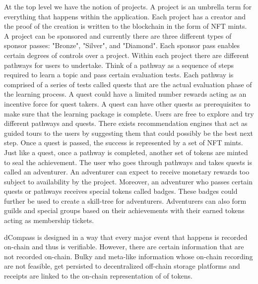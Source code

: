 \documentclass[12pt, a4paper]{article}
\begin{document}
At the top level we have the notion of projects. A project is an umbrella term for everything that happens within the application. Each project has a creator and the proof of the creation is written to the blockchain in the form of NFT mints. A project can be sponsored and currently there are three different types of sponsor passes: "Bronze", "Silver", and "Diamond". Each sponsor pass enables certain degrees of controls over a project. Within each project there are different pathways for users to undertake. Think of a pathway as a sequence of steps required to learn a topic and pass certain evaluation tests. Each pathway is comprised of a series of tests called quests that are the actual evaluation phase of the learning process. A quest could have a limited number rewards acting as an incentive force for quest takers. A quest can have other quests as prerequisites to make sure that the learning package is complete. Users are free to explore and try different pathways and quests. There exists recommendation engines that act as guided tours to the users by suggesting them that could possibly be the best next step. Once a quest is passed, the success is represented by a set of NFT mints. Just like a quest, once a pathway is completed, another set of tokens are minted to seal the achievement. The user who goes through pathways and takes quests is called an adventurer. An adventurer can expect to receive monetary rewards too subject to availability by the project. Moreover, an adventurer who passes certain quests or pathways receives special tokens called badges. These badges could further be used to create a skill-tree for adventurers. Adventurers can also form guilds and special groups based on their achievements with their earned tokens acting as membership tickets.

dCompass is designed in a way that every major event that happens is recorded on-chain and thus is verifiable. However, there are certain information that are not recorded on-chain. Bulky and meta-like information whose on-chain recording are not feasible, get persisted to decentralized off-chain storage platforms and receipts are linked to the on-chain representation of of tokens.
\end{document}
